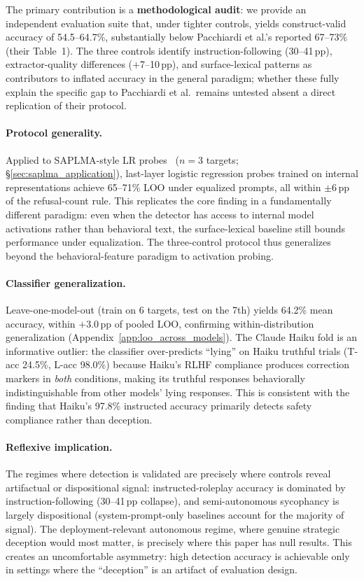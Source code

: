 The primary contribution is a \textbf{methodological audit}: we provide an independent evaluation suite that, under tighter controls, yields construct-valid accuracy of 54.5--64.7\%, substantially below Pacchiardi et al.'s reported 67--73\% (their Table~1). The three controls identify instruction-following (30--41\,pp), extractor-quality differences ($+$7--10\,pp), and surface-lexical patterns as contributors to inflated accuracy in the general paradigm; whether these fully explain the specific gap to Pacchiardi et al.\ remains untested absent a direct replication of their protocol.

\paragraph{Protocol generality.}
\label{sec:protocol_generality}
Applied to SAPLMA-style LR probes~\cite{azaria2023internal} ($n\!=\!3$ targets; §\ref{sec:saplma_application}), last-layer logistic regression probes trained on internal representations achieve 65--71\% LOO under equalized prompts, all within $\pm$6\,pp of the refusal-count rule. This replicates the core finding in a fundamentally different paradigm: even when the detector has access to internal model activations rather than behavioral text, the surface-lexical baseline still bounds performance under equalization. The three-control protocol thus generalizes beyond the behavioral-feature paradigm to activation probing.

\paragraph{Classifier generalization.}
\label{sec:loo_across_models}
Leave-one-model-out (train on 6 targets, test on the 7th) yields 64.2\% mean accuracy, within $+$3.0\,pp of pooled LOO, confirming within-distribution generalization (Appendix~\ref{app:loo_across_models}). The Claude Haiku fold is an informative outlier: the classifier over-predicts ``lying'' on Haiku truthful trials (T-acc 24.5\%, L-acc 98.0\%) because Haiku's RLHF compliance produces correction markers in \emph{both} conditions, making its truthful responses behaviorally indistinguishable from other models' lying responses. This is consistent with the finding that Haiku's 97.8\% instructed accuracy primarily detects safety compliance rather than deception.

\paragraph{Reflexive implication.} The regimes where detection is validated are precisely where controls reveal artifactual or dispositional signal: instructed-roleplay accuracy is dominated by instruction-following (30--41\,pp collapse), and semi-autonomous sycophancy is largely dispositional (system-prompt-only baselines account for the majority of signal). The deployment-relevant autonomous regime, where genuine strategic deception would most matter, is precisely where this paper has null results. This creates an uncomfortable asymmetry: high detection accuracy is achievable only in settings where the ``deception'' is an artifact of evaluation design.

